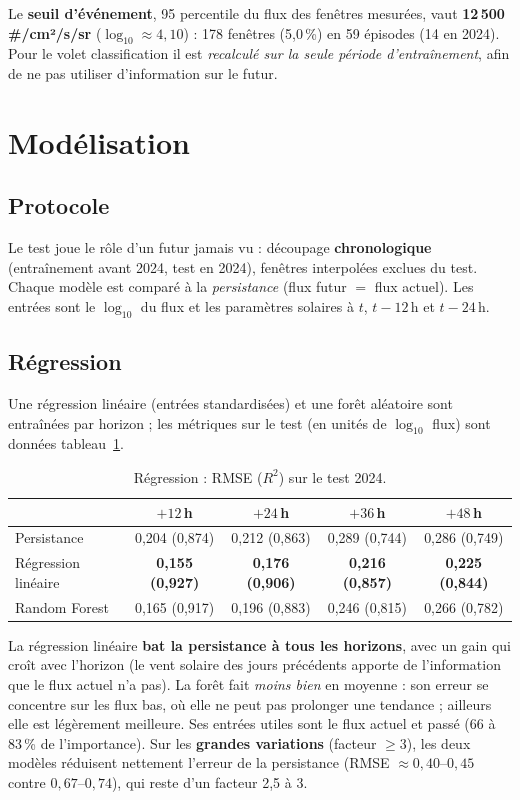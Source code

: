 \documentclass[11pt,a4paper]{article}
\begin{document}
Le \textbf{seuil d'événement}, 95\ieme{} percentile du flux des fenêtres mesurées, vaut
\textbf{12\,500\,\#/cm²/s/sr} ($\log_{10}\approx 4{,}10$) : 178 fenêtres (5,0\,\%) en 59 épisodes
(14 en 2024). Pour le volet classification il est \emph{recalculé sur la seule période
d'entraînement}, afin de ne pas utiliser d'information sur le futur.

\section{Modélisation}

\subsection{Protocole}
Le test joue le rôle d'un futur jamais vu : découpage \textbf{chronologique} (entraînement avant
2024, test en 2024), fenêtres interpolées exclues du test. Chaque modèle est comparé à la
\emph{persistance} (flux futur $=$ flux actuel). Les entrées sont le $\log_{10}$ du flux et les
paramètres solaires à $t$, $t-12$\,h et $t-24$\,h.

\subsection{Régression}
Une régression linéaire (entrées standardisées) et une forêt aléatoire sont entraînées par
horizon ; les métriques sur le test (en unités de $\log_{10}$ flux) sont données
tableau~\ref{tab:reg}.

\begin{table}[h]
\centering\small
\caption{Régression : RMSE ($R^2$) sur le test 2024.}
\label{tab:reg}
\begin{tabular}{lcccc}
\toprule
& $+12$\,h & $+24$\,h & $+36$\,h & $+48$\,h \\
\midrule
Persistance          & 0,204 (0,874) & 0,212 (0,863) & 0,289 (0,744) & 0,286 (0,749) \\
Régression linéaire  & \textbf{0,155 (0,927)} & \textbf{0,176 (0,906)} & \textbf{0,216 (0,857)} & \textbf{0,225 (0,844)} \\
Random Forest        & 0,165 (0,917) & 0,196 (0,883) & 0,246 (0,815) & 0,266 (0,782) \\
\bottomrule
\end{tabular}
\end{table}

La régression linéaire \textbf{bat la persistance à tous les horizons}, avec un gain qui croît
avec l'horizon (le vent solaire des jours précédents apporte de l'information que le flux actuel
n'a pas). La forêt fait \emph{moins bien} en moyenne : son erreur se concentre sur les flux bas,
où elle ne peut pas prolonger une tendance ; ailleurs elle est légèrement meilleure. Ses entrées
utiles sont le flux actuel et passé (66 à 83\,\% de l'importance). Sur les \textbf{grandes
variations} (facteur $\ge 3$), les deux modèles réduisent nettement l'erreur de la persistance
(RMSE $\approx 0{,}40$--$0{,}45$ contre $0{,}67$--$0{,}74$), qui reste d'un facteur 2,5 à 3.
\end{document}
